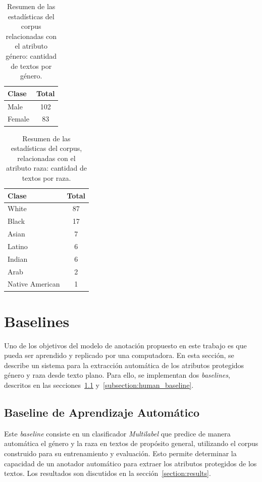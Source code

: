 \begin{table}[htpb]
    \centering
        \begin{tabular}{lc}
        \toprule
          \textbf{Clase} & \textbf{Total} \\
        \midrule
                    Male & 102 \\
                  Female & 83 \\

        \bottomrule
        \end{tabular}
    \caption{Resumen de las estad\'isticas del corpus relacionadas con el atributo g\'enero: cantidad de textos por g\'enero.}
    \label{table:stats_gen}
\end{table}

\begin{table}[htpb]
    \centering
        \begin{tabular}{lc}
        \toprule
            \textbf{Clase} & \textbf{Total} \\
        \midrule
                     White & 87 \\
                     Black & 17 \\
                     Asian & 7 \\
                    Latino & 6 \\
                    Indian & 6 \\
                      Arab & 2 \\
           Native American & 1 \\

        \bottomrule
        \end{tabular}
    \caption{Resumen de las estad\'isticas del corpus, relacionadas con el atributo raza: cantidad de textos por raza.}
    \label{table:stats_race}
\end{table}

\section{Baselines}\label{section:baseline}
Uno de los objetivos del modelo de anotaci\'on propuesto en este trabajo es que pueda ser aprendido 
y replicado por una computadora. En esta secci\'on, se describe un sistema para la extracci\'on
autom\'atica de los atributos protegidos g\'enero y raza desde texto plano. Para ello, se 
implementan dos \emph{baselines}, descritos en las secciones~\ref{subsection:ml_baseline} 
y~\ref{subsection:human_baseline}.

\subsection{Baseline de Aprendizaje Autom\'atico}\label{subsection:ml_baseline}
Este \emph{baseline} consiste en un clasificador \emph{Multilabel}  que predice 
de manera autom\'atica el g\'enero y la raza en textos de prop\'osito general, utilizando el corpus construido 
para su entrenamiento y evaluaci\'on. Esto permite determinar la capacidad de un anotador autom\'atico para 
extraer los atributos protegidos de los textos. Los resultados son discutidos en la secci\'on~\ref{section:results}.

